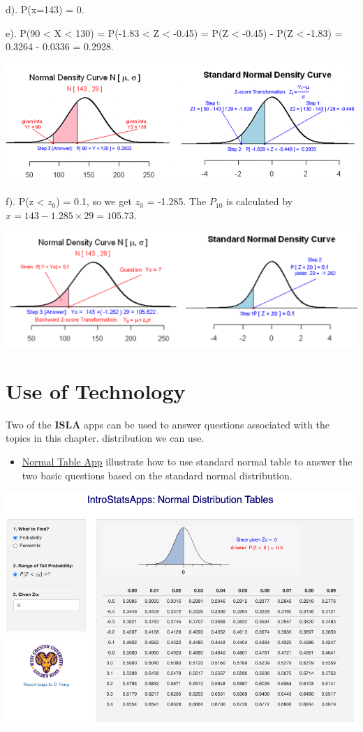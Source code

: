 \documentclass[
]{book}
\providecommand{\tightlist}{%
  \setlength{\itemsep}{0pt}\setlength{\parskip}{0pt}}
\begin{document}
d). P(x=143) = 0.

e). P(90 \textless{} X \textless{} 130) = P(-1.83 \textless{} Z \textless{} -0.45) = P(Z \textless{} -0.45) - P(Z \textless{} -1.83) = 0.3264 - 0.0336 = 0.2928.

\hfill\break

\begin{center}\includegraphics[width=0.6\linewidth]{week04/example09e} \end{center}

f). P(z \textless{} \(z_0\)) = 0.1, so we get \(z_0\) = -1.285. The \(P_{10}\) is calculated by \(x = 143-1.285\times 29 = 105.73\).

\hfill\break

\begin{center}\includegraphics[width=0.6\linewidth]{week04/example09f} \end{center}

\hypertarget{use-of-technology-2}{%
\section{Use of Technology}\label{use-of-technology-2}}

Two of the \textbf{ISLA} apps can be used to answer questions associated with the topics in this chapter. distribution we can use.

\begin{itemize}
\tightlist
\item
  \href{https://wcupeng.shinyapps.io/ZTable/}{Normal Table App} illustrate how to use standard normal table to answer the two basic questions based on the standard normal distribution.
\end{itemize}

\begin{center}\includegraphics[width=0.8\linewidth]{week04/introStatsApps-Ztable} \end{center}
\end{document}
